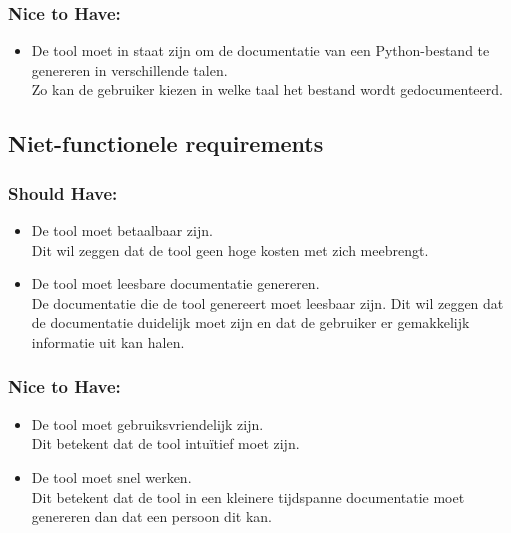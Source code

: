 \subsubsection{Nice to Have:}
\begin{itemize}
    \item De tool moet in staat zijn om de documentatie van een Python-bestand te genereren in verschillende talen.\\
    Zo kan de gebruiker kiezen in welke taal het bestand wordt gedocumenteerd.
\end{itemize}

\subsection{Niet-functionele requirements}
\label{sec:niet-functionele-requirements}
\subsubsection{Should Have:}
\begin{itemize}
    \item De tool moet betaalbaar zijn.\\
    Dit wil zeggen dat de tool geen hoge kosten met zich meebrengt.
    \item De tool moet leesbare documentatie genereren.\\
    De documentatie die de tool genereert moet leesbaar zijn. Dit wil zeggen dat de documentatie duidelijk moet zijn en dat de gebruiker er gemakkelijk informatie uit kan halen.    
\end{itemize}

\subsubsection{Nice to Have:}
\begin{itemize}
    \item De tool moet gebruiksvriendelijk zijn.\\
    Dit betekent dat de tool intuïtief moet zijn.
    \item De tool moet snel werken.\\
    Dit betekent dat de tool in een kleinere tijdspanne documentatie moet genereren dan dat een persoon dit kan.
\end{itemize}


